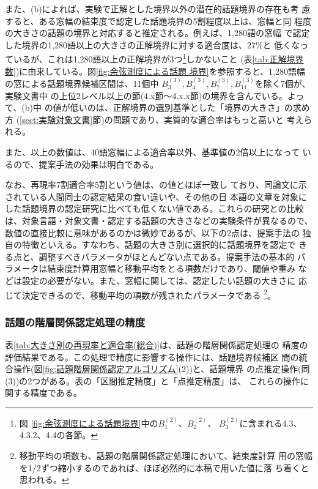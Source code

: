 また、(b)によれば、実験で正解とした境界以外の潜在的話題境界の存在も考
慮すると、ある窓幅の結束度で認定した話題境界の5割程度以上は、窓幅と同
程度の大きさの話題の境界と対応すると推定される。例えば、1,280語の窓幅
で認定した境界の1,280語以上の大きさの正解境界に対する適合度は、27\%と
低くなっているが、これは1,280語以上の正解境界が3つ\footnote{図
  \ref{fig:余弦測度による話題境界}中の$B^{(2)}_1$、$B^{(2)}_2$、
  $B^{(2)}_3$に含まれる4.3、 4.3.2、4.4の各節。}しかないこと
(表\ref{tab:正解境界数})に由来している。図\ref{fig:余弦測度による話題
  境界}を参照すると、1,280語幅の窓による話題境界候補区間は、11個中
$B^{(3)}_3, B^{(3)}_4, B^{(3)}_7, B^{(3)}_{11}$を除く7個が、実験文書中
の上位2レベル以上の節(4.x節〜4.x.x節)の境界を含んでいる。よって、(b)中
の値が低いのは、正解境界の選別基準とした「境界の大きさ」の求め方
(\ref{sect:実験対象文書}節)の問題であり、実質的な適合率はもっと高いと
考えられる。

また、以上の数値は、40語窓幅による適合率以外、基準値の2倍以上になって
いるので、提案手法の効果は明白である。

なお、再現率7割適合率5割という値は、\cite{PACL-32-P9}の値とほぼ一致し
ており、同論文に示されている人間同士の認定結果の食い違いや、その他の日
本語の文章を対象にした話題境界の認定研究\cite[など]
{NLC93-8,PNLP-2-P325}に比べても低くない値である。これらの研究との比較
は、対象言語・対象文書・認定する話題の大きさなどの実験条件が異なるので、
数値の直接比較に意味があるのかは微妙であるが、以下の2点は、提案手法の
独自の特徴といえる。すなわち、話題の大きさ別に選択的に話題境界を認定で
きる点と、調整すべきパラメータがほとんどない点である。提案手法の基本的
パラメータは結束度計算用窓幅と移動平均をとる項数だけであり、閾値や重み
などは設定の必要がない。また、窓幅に関しては、認定したい話題の大きさに
応じて決定できるので、移動平均の項数が残されたパラメータである
\footnote{移動平均の項数も、話題の階層関係認定処理において、結束度計算
  用の窓幅を1/2ずつ縮小するのであれば、ほぼ必然的に本稿で用いた値に落
  ち着くと思われる。}。

\subsubsection{話題の階層関係認定処理の精度}
\label{sect:話題の階層関係認定精度}

表\ref{tab:大きさ別の再現率と適合率(総合)}は、話題の階層関係認定処理の
精度の評価結果である。この処理で精度に影響する操作には、話題境界候補区
間の統合操作(図\ref{fig:話題階層関係認定アルゴリズム}(2))と、話題境界
の点推定操作(同(3))の2つがある。表の「区間推定精度」と「点推定精度」は、
これらの操作に関する精度である。

